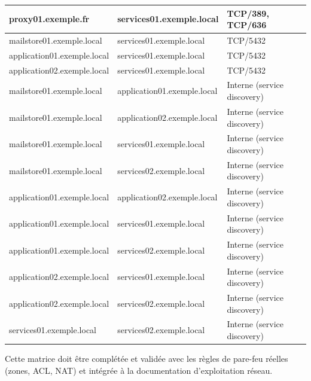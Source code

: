 \documentclass[11pt,a4paper]{report}
\begin{document}
\begin{longtable}{|p{5cm}|p{5cm}|p{5cm}|}
\hline
proxy01.\allowbreak{}exemple.\allowbreak{}fr & services01.\allowbreak{}exemple.\allowbreak{}local & TCP/389, TCP/636 \\
\hline
mailstore01.\allowbreak{}exemple.\allowbreak{}local & services01.\allowbreak{}exemple.\allowbreak{}local & TCP/5432 \\
\hline
application01.\allowbreak{}exemple.\allowbreak{}local & services01.\allowbreak{}exemple.\allowbreak{}local & TCP/5432 \\
\hline
application02.\allowbreak{}exemple.\allowbreak{}local & services01.\allowbreak{}exemple.\allowbreak{}local & TCP/5432 \\
\hline
mailstore01.\allowbreak{}exemple.\allowbreak{}local & application01.\allowbreak{}exemple.\allowbreak{}local & Interne (service discovery) \\
\hline
mailstore01.\allowbreak{}exemple.\allowbreak{}local & application02.\allowbreak{}exemple.\allowbreak{}local & Interne (service discovery) \\
\hline
mailstore01.\allowbreak{}exemple.\allowbreak{}local & services01.\allowbreak{}exemple.\allowbreak{}local & Interne (service discovery) \\
\hline
mailstore01.\allowbreak{}exemple.\allowbreak{}local & services02.\allowbreak{}exemple.\allowbreak{}local & Interne (service discovery) \\
\hline
application01.\allowbreak{}exemple.\allowbreak{}local & application02.\allowbreak{}exemple.\allowbreak{}local & Interne (service discovery) \\
\hline
application01.\allowbreak{}exemple.\allowbreak{}local & services01.\allowbreak{}exemple.\allowbreak{}local & Interne (service discovery) \\
\hline
application01.\allowbreak{}exemple.\allowbreak{}local & services02.\allowbreak{}exemple.\allowbreak{}local & Interne (service discovery) \\
\hline
application02.\allowbreak{}exemple.\allowbreak{}local & services01.\allowbreak{}exemple.\allowbreak{}local & Interne (service discovery) \\
\hline
application02.\allowbreak{}exemple.\allowbreak{}local & services02.\allowbreak{}exemple.\allowbreak{}local & Interne (service discovery) \\
\hline
services01.\allowbreak{}exemple.\allowbreak{}local & services02.\allowbreak{}exemple.\allowbreak{}local & Interne (service discovery) \\
\hline
\end{longtable}
Cette matrice doit être complétée et validée avec les règles de pare-feu réelles (zones, ACL, NAT) et intégrée à la documentation d'exploitation réseau.
\end{document}
